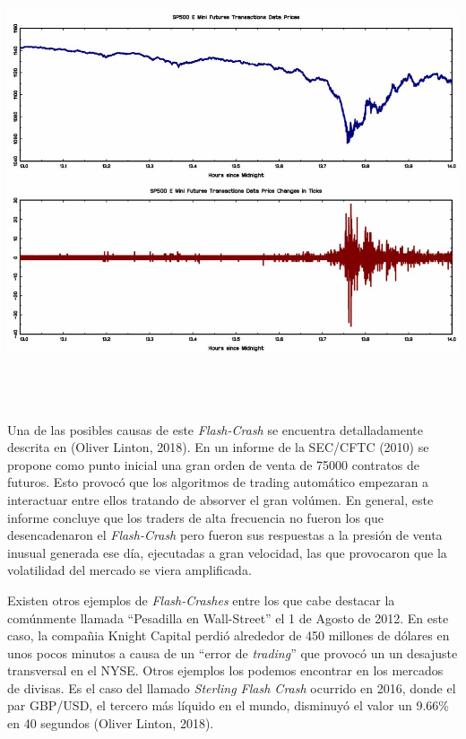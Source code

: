 \documentclass[]{DissertateUSU}
\begin{document}
\includegraphics[width=7.8125in,height=5.20833in]{flashcrash1.JPG}
\centering
{}

\justifying
\setlength\parskip{5ex}

\noindent Una de las posibles causas de este \emph{Flash-Crash} se
encuentra detalladamente descrita en (Oliver Linton, 2018). En un
informe de la SEC/CFTC (2010) se propone como punto inicial una gran
orden de venta de 75000 contratos de futuros. Esto provocó que los
algoritmos de trading automático empezaran a interactuar entre ellos
tratando de absorver el gran volúmen. En general, este informe concluye
que los traders de alta frecuencia no fueron los que desencadenaron el
\emph{Flash-Crash} pero fueron sus respuestas a la presión de venta
inusual generada ese día, ejecutadas a gran velocidad, las que
provocaron que la volatilidad del mercado se viera amplificada.

\setlength\parskip{5ex}

\noindent Existen otros ejemplos de \emph{Flash-Crashes} entre los que
cabe destacar la comúnmente llamada ``Pesadilla en Wall-Street'' el 1 de
Agosto de 2012. En este caso, la compañia Knight Capital perdió
alrededor de 450 millones de dólares en unos pocos minutos a causa de un
``error de \emph{trading}'' que provocó un un desajuste transversal en
el NYSE. Otros ejemplos los podemos encontrar en los mercados de
divisas. Es el caso del llamado \emph{Sterling Flash Crash} ocurrido en
2016, donde el par GBP/USD, el tercero más líquido en el mundo,
disminuyó el valor un 9.66\% en 40 segundos (Oliver Linton, 2018).
\end{document}
